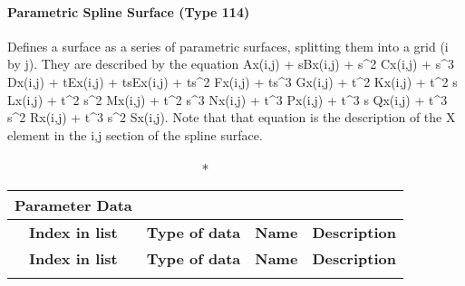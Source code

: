 \paragraph{Parametric Spline Surface (Type
114)}\label{parametric-spline-surface-type-114}

Defines a surface as a series of parametric surfaces, splitting them
into a grid (i by j). They are described by the equation Ax(i,j) +
sBx(i,j) + s\^{}2 Cx(i,j) + s\^{}3 Dx(i,j) + tEx(i,j) + tsEx(i,j) +
ts\^{}2 Fx(i,j) + ts\^{}3 Gx(i,j) + t\^{}2 Kx(i,j) + t\^{}2 s Lx(i,j) +
t\^{}2 s\^{}2 Mx(i,j) + t\^{}2 s\^{}3 Nx(i,j) + t\^{}3 Px(i,j) + t\^{}3
s Qx(i,j) + t\^{}3 s\^{}2 Rx(i,j) + t\^{}3 s\^{}2 Sx(i,j). Note that
that equation is the description of the X element in the i,j section of
the spline surface.

\begin{longtable}[H]{|c|c|c|l|}
  \caption*{Parameter Data} \\

  \hline
  \multicolumn{1}{|c|}{\textbf{Index in list}} & \multicolumn{1}{|c|}{\textbf{Type of data}} &
  \multicolumn{1}{|c|}{\textbf{Name}} & \multicolumn{1}{|c|}{\textbf{Description}} \\ \hline
  \endfirsthead
  \hline
  \multicolumn{1}{|c|}{\textbf{Index in list}} & \multicolumn{1}{|c|}{\textbf{Type of data}} &
  \multicolumn{1}{|c|}{\textbf{Name}} & \multicolumn{1}{|c|}{\textbf{Description}} \\ \hline
  \endhead
  
  \endfoot


\end{longtable}
